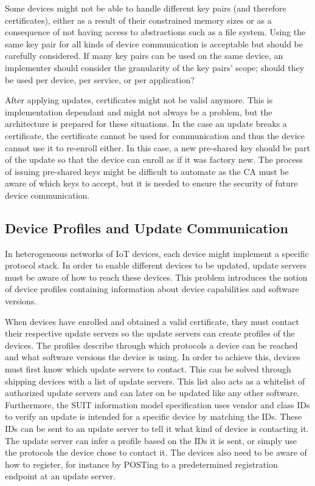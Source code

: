 \documentclass[0-thesis.tex]{subfiles}
\begin{document}
Some devices might not be able to handle different key pairs (and therefore certificates),
either as a result of their constrained memory sizes or as a consequence of not having
access to abstractions such as a file system. Using the same key pair for all kinds of
device communication is acceptable but should be carefully considered. If many key pairs
can be used on the same device, an implementer should consider the granularity of the key
pairs' scope; should they be used per device, per service, or per application?

After applying updates, certificates might not be valid anymore. This is implementation
dependant and might not always be a problem, but the architecture is prepared for these
situations. In the case an update breaks a certificate, the certificate cannot be used for
communication and thus the device cannot use it to re-enroll either. In this case, a new
pre-shared key should be part of the update so that the device can enroll as if it was
factory new. The process of issuing pre-shared keys might be difficult to automate as the
CA must be aware of which keys to accept, but it is needed to ensure the security of
future device communication.

\subsection{Device Profiles and Update Communication}
\label{ssec:communication}
In heterogeneous networks of IoT devices, each device might implement a specific protocol
stack. In order to enable different devices to be updated, update servers must be aware of
how to reach these devices. This problem introduces the notion of device profiles
containing information about device capabilities and software versions. 

When devices have enrolled and obtained a valid certificate, they must contact their
respective update servers so the update servers can create profiles of the devices. The
profiles describe through which protocols a device can be reached and what software
versions the device is using. In order to achieve this, devices must first know which
update servers to contact. This can be solved through shipping devices with a list of
update servers. This list also acts as a whitelist of authorized update servers and can
later on be updated like any other software. Furthermore, the SUIT information model
specification uses vendor and class IDs to verify an update is intended for a specific
device by matching the IDs. These IDs can be sent to an update server to tell it what kind
of device is contacting it. The update server can infer a profile based on the IDs it is
sent, or simply use the protocols the device chose to contact it. The devices also need to
be aware of how to register, for instance by POSTing to a predetermined registration
endpoint at an update server. 
\end{document}
